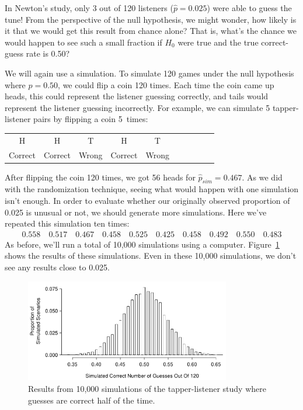 In Newton's study, only 3 out of 120 listeners ($\hat{p} = 0.025$) were able to guess the tune! From the perspective of the null hypothesis, we might wonder, how likely is it that we would get this result from chance alone? That is, what's the chance we would happen to see such a small fraction if $H_0$ were true and the true correct-guess rate is 0.50?

We will again use a simulation. To simulate 120 games under the null hypothesis where $p = 0.50$, we could flip a coin 120 times. Each time the coin came up heads, this could represent the listener guessing correctly, and tails would represent the listener guessing incorrectly. For example, we can simulate 5 tapper-listener pairs by flipping a coin 5~times:
\begin{center}
\begin{tabular}{ccc ccc ccc c}
H & H & T & H & T \\
Correct & Correct & Wrong & Correct & Wrong \\
\end{tabular}
\end{center}
After flipping the coin 120 times, we got 56 heads for $\hat{p}_{sim} = 0.467$. As we did with the randomization technique, seeing what would happen with one simulation isn't enough. In order to evaluate whether our originally observed proportion of 0.025 is unusual or not, we should generate more simulations. Here we've repeated this simulation ten times:
\begin{align*}
0.558 \quad 0.517 \quad 0.467 \quad 0.458 \quad
0.525 \quad 0.425 \quad 0.458 \quad 0.492 \quad
0.550 \quad 0.483
\end{align*} %
As before, we'll run a total of 10,000 simulations using a computer. Figure~\ref{TappersAndListenersNullDistribution} shows the results of these simulations. Even in these 10,000 simulations, we don't see any results close to 0.025.

\begin{figure}[ht]
\centering
\includegraphics[width=0.8\textwidth]{05/figures/TappersAndListeners/TappersAndListenersNullDistribution}
\caption{Results from 10,000 simulations of the tapper-listener study where guesses are correct half of the time.}
\label{TappersAndListenersNullDistribution}
\end{figure}

